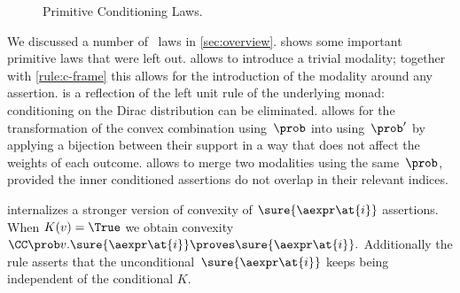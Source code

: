 \documentclass[acmsmall,nonacm,screen,appendix]{acmart}
\newenvironment{mathfig}[1][]{\begin{figure}[tp]\adjustfigure[#1]}{\end{figure}}
\begin{document}
\begin{mathfig}[\small]
  \begin{proofrules}
         \label{rule:c-true}

         \label{rule:c-unit-l}

         \label{rule:c-transf}

         \label{rule:c-and}

         \label{rule:sure-str-convex}

         \label{rule:c-pure}
  \end{proofrules}
  \caption{Primitive Conditioning Laws.}
  \label{fig:cond-laws}
\end{mathfig}

We discussed a number of \supercond\ laws in \cref{sec:overview}.
 shows some important primitive laws
that were left out.
 allows to introduce a trivial modality;
together with \ref{rule:c-frame} this allows for the introduction
of the modality around any assertion.
 is a reflection of the left unit rule of the underlying
monad: conditioning on the Dirac distribution can be eliminated.
 allows for the transformation of the
convex combination using~$\prob$
into using~$\prob'$ by applying a bijection between their support
in a way that does not affect the weights of each outcome.
 allows to merge two modalities using the same~$\prob$,
provided the inner conditioned assertions do not overlap
in their relevant indices.


 internalizes a stronger version of convexity of
$ \sure{\aexpr\at{i}} $ assertions.
When $K(v) = \True$ we obtain convexity
$
  \CC\prob v.\sure{\aexpr\at{i}}
  \proves
  \sure{\aexpr\at{i}}.
$
Additionally the rule asserts that the unconditional~$\sure{\aexpr\at{i}}$
keeps being independent of the conditional $K$.
\end{document}
